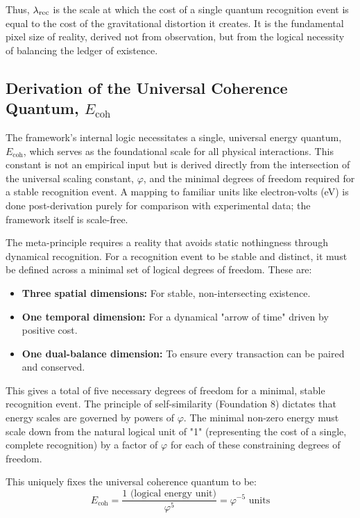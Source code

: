 Thus, \(\lambda_{\text{rec}}\) is the scale at which the cost of a single quantum recognition event is equal to the cost of the gravitational distortion it creates. It is the fundamental pixel size of reality, derived not from observation, but from the logical necessity of balancing the ledger of existence.

\subsection{Derivation of the Universal Coherence Quantum, \texorpdfstring{$E_{\text{coh}}$}{E_coh}}
The framework's internal logic necessitates a single, universal energy quantum, \(E_{\text{coh}}\), which serves as the foundational scale for all physical interactions. This constant is not an empirical input but is derived directly from the intersection of the universal scaling constant, \(\varphi\), and the minimal degrees of freedom required for a stable recognition event. A mapping to familiar units like electron-volts (eV) is done post-derivation purely for comparison with experimental data; the framework itself is scale-free.

The meta-principle requires a reality that avoids static nothingness through dynamical recognition. For a recognition event to be stable and distinct, it must be defined across a minimal set of logical degrees of freedom. These are:
\begin{itemize}
    \item \textbf{Three spatial dimensions:} For stable, non-intersecting existence.
    \item \textbf{One temporal dimension:} For a dynamical "arrow of time" driven by positive cost.
    \item \textbf{One dual-balance dimension:} To ensure every transaction can be paired and conserved.
\end{itemize}
This gives a total of five necessary degrees of freedom for a minimal, stable recognition event. The principle of self-similarity (Foundation 8) dictates that energy scales are governed by powers of \(\varphi\). The minimal non-zero energy must scale down from the natural logical unit of "1" (representing the cost of a single, complete recognition) by a factor of \(\varphi\) for each of these constraining degrees of freedom.

This uniquely fixes the universal coherence quantum to be:
\begin{equation}
E_{\text{coh}} = \frac{1 \text{ (logical energy unit)}}{\varphi^5} = \varphi^{-5} \text{ units}
\end{equation}

